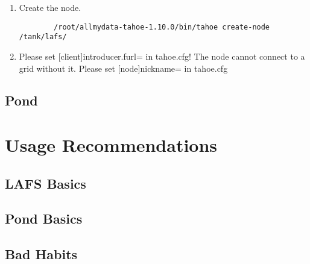 \documentclass[letterpaper]{article}
\begin{document}
\begin{enumerate}
\item
    Create the node.
    \begin{verbatim}
        /root/allmydata-tahoe-1.10.0/bin/tahoe create-node /tank/lafs/
    \end{verbatim}

\item
    
 Please set [client]introducer.furl= in tahoe.cfg!
 The node cannot connect to a grid without it.
 Please set [node]nickname= in tahoe.cfg
\end{enumerate}

\subsection{Pond}

\section{Usage Recommendations}

\subsection{LAFS Basics}

\subsection{Pond Basics}

\subsection{Bad Habits}
\end{document}
